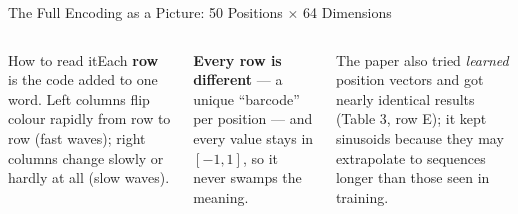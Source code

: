 \documentclass[aspectratio=169,10pt]{beamer}
\begin{document}
\begin{frame}{The Full Encoding as a Picture: 50 Positions $\times$ 64 Dimensions}
\begin{columns}[T]
\begin{cbox}{How to read it}\scriptsize Each \textbf{row} is the code added to one word. Left columns flip colour rapidly from row to row (fast waves); right columns change slowly or hardly at all (slow waves).\end{cbox}
\begin{rbox}\scriptsize\textbf{Every row is different} --- a unique ``barcode'' per position --- and every value stays in $[-1,1]$, so it never swamps the meaning.\end{rbox}
\begin{ibox}\scriptsize The paper also tried \emph{learned} position vectors and got nearly identical results (Table 3, row E); it kept sinusoids because they may extrapolate to sequences longer than those seen in training.\end{ibox}
\end{columns}
\end{frame}
\end{document}
